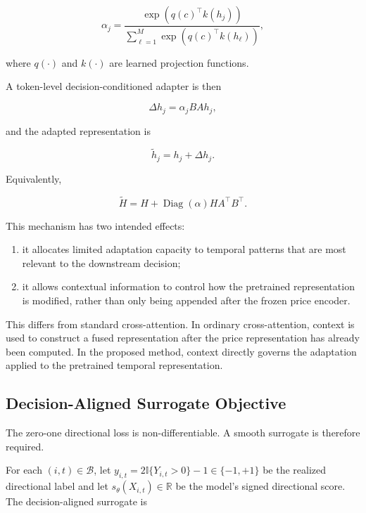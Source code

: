 \documentclass[11pt]{article}
\newcommand{\R}{\mathbb{R}}
\newcommand{\ind}{\mathbb{I}}
\begin{document}
\begin{equation}
\alpha_j
=
\frac{
\exp
\left(
q(c)^\top k(h_j)
\right)
}{
\sum_{\ell=1}^{M}
\exp
\left(
q(c)^\top k(h_\ell)
\right)
},
\end{equation}

where $q(\cdot)$ and $k(\cdot)$ are learned projection functions.

A token-level decision-conditioned adapter is then

\begin{equation}
\Delta h_j
=
\alpha_j
B A h_j,
\end{equation}

and the adapted representation is

\begin{equation}
\widetilde h_j
=
h_j+\Delta h_j.
\end{equation}

Equivalently,

\begin{equation}
\widetilde H
=
H+
\operatorname{Diag}(\alpha)
H A^\top B^\top.
\end{equation}

This mechanism has two intended effects:

\begin{enumerate}
    \item it allocates limited adaptation capacity to temporal patterns that
    are most relevant to the downstream decision;

    \item it allows contextual information to control how the pretrained
    representation is modified, rather than only being appended after the
    frozen price encoder.
\end{enumerate}

This differs from standard cross-attention. In ordinary cross-attention,
context is used to construct a fused representation after the price
representation has already been computed. In the proposed method, context
directly governs the adaptation applied to the pretrained temporal
representation.

\subsection{Decision-Aligned Surrogate Objective}

The zero-one directional loss is non-differentiable. A smooth surrogate is
therefore required.

For each $(i,t)\in\mathcal B$, let
$y_{i,t}=2\ind\{Y_{i,t}>0\}-1\in\{-1,+1\}$ be the realized directional label
and let $s_\theta(X_{i,t})\in\R$ be the model's signed directional score. The
decision-aligned surrogate is
\end{document}
